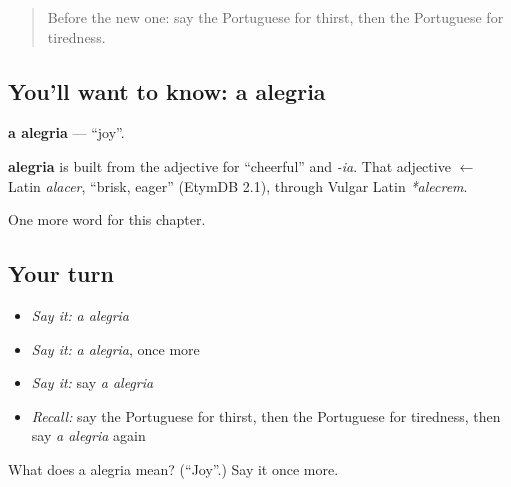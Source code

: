 \label{lesson:PT-C35-alegria}



\begin{quote}
Before the new one: say the Portuguese for thirst, then the Portuguese for tiredness.
\end{quote}

\subsection*{You'll want to know: a alegria}
\textbf{a alegria} — \textquotedblleft{}joy\textquotedblright{}.

\begin{cousinweb}
\textbf{alegria} is built from the adjective for \textquotedblleft{}cheerful\textquotedblright{} and \emph{-ia}. That adjective $\leftarrow$ Latin \emph{alacer}, \textquotedblleft{}brisk, eager\textquotedblright{} (EtymDB 2.1), through Vulgar Latin \emph{*alecrem}.
\end{cousinweb}

\begin{grammarlens}[title={What you've built}]
One more word for this chapter.
\end{grammarlens}

\subsection*{Your turn}
\begin{itemize}
\raggedright
  \item \emph{Say it:} \emph{a alegria}
  \item \emph{Say it:} \emph{a alegria}, once more
  \item \emph{Say it:} say \emph{a alegria}
  \item \emph{Recall:} say the Portuguese for thirst, then the Portuguese for tiredness, then say \emph{a alegria} again
\end{itemize}

\begin{tcolorbox}[breakable,colback=teal!4,colframe=teal!35!black,title={Before you move on}]
What does a alegria mean? (\textquotedblleft{}Joy\textquotedblright{}.) Say it once more.
\end{tcolorbox}
